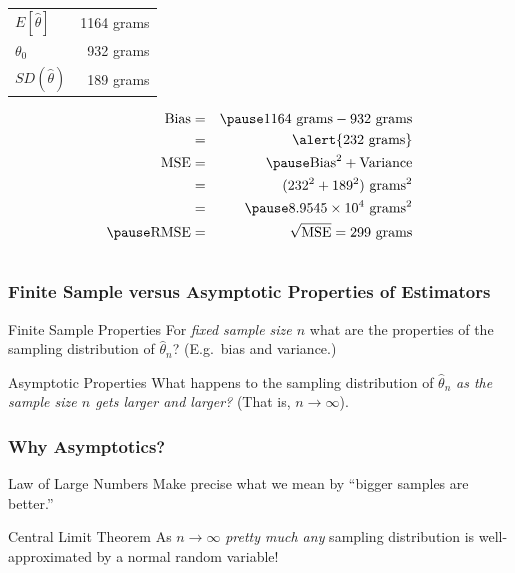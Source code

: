 \documentclass[handout]{beamer}
\begin{document}
\begin{frame}
\begin{columns}
\begin{column}[c]{6cm} 
\small
   \begin{tabular}{lr}
   \hline
   \hline
   $E[\hat{\theta}]$& 1164 grams\\
   $\theta_0$& 932 grams\\
   $SD(\widehat{\theta})$& 189 grams\\
   \hline
   \end{tabular}
\vspace{2em}

\begin{eqnarray*}
	\mbox{Bias} &=& \pause 1164 \mbox{ grams} - 932 \mbox{ grams}\\
		&=& \alert{232 \mbox{ grams}}\\
		\mbox{MSE} &=&\pause  \mbox{Bias}^2 + \mbox{Variance}\\
			&=& (232^2 + 189^2)\mbox{ grams}^2\\
				&=&\pause 8.9545 \times 10^4 \mbox{ grams}^2\\ \pause
				\mbox{RMSE} &=& \sqrt{\mbox{MSE}} =  299\mbox{ grams}
\end{eqnarray*}
\end{column} 

\end{columns} 


\end{frame}
\begin{frame}
\frametitle{Finite Sample versus Asymptotic Properties of Estimators}

\begin{block}{Finite Sample Properties}
For \alert{\emph{fixed sample size $n$}} what are the properties of the sampling distribution of $\widehat{\theta}_n$? (E.g.\ bias and variance.)
\end{block}
\begin{block}{Asymptotic Properties}
What happens to the sampling distribution of $\widehat{\theta}_n$ \alert{\emph{as the sample size $n$ gets larger and larger?}} (That is, $n\rightarrow \infty$).
\end{block}

\end{frame}
\begin{frame}
\frametitle{Why Asymptotics?}

\begin{block}{Law of Large Numbers}
Make precise what we mean by ``bigger samples are better.'' 
\end{block}
\begin{block}{Central Limit Theorem}
As $n\rightarrow \infty$  \emph{\alert{pretty much any}} sampling distribution is well-approximated by a normal random variable!
\end{block}


\end{frame}
\end{document}
